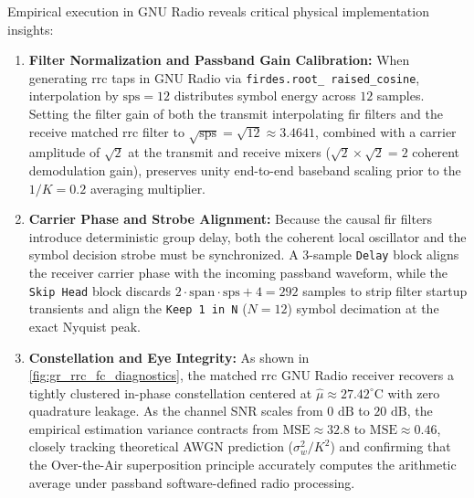 \documentclass[Markos_Delaportas_1316.tex]{subfiles}
\begin{document}
Empirical execution in GNU Radio reveals critical physical
implementation insights:
\begin{enumerate}
    \item \textbf{Filter Normalization and Passband Gain Calibration:}
        When generating \gls{rrc} taps in GNU Radio via
        \texttt{firdes.\allowbreak root\_\allowbreak
        raised\_\allowbreak cosine}, interpolation by
        $\text{sps} = 12$ distributes symbol energy across $12$
        samples. Setting the filter gain of both the transmit
        interpolating \gls{fir} filters and the receive matched
        \gls{rrc} filter to $\sqrt{\text{sps}} = \sqrt{12} \approx
        3.4641$, combined with a carrier amplitude of $\sqrt{2}$ at the
        transmit and receive mixers ($\sqrt{2} \times \sqrt{2} = 2$ coherent
        demodulation gain), preserves unity end-to-end baseband scaling
        prior to the $1/K = 0.2$ averaging multiplier.
    \item \textbf{Carrier Phase and Strobe Alignment:} Because the
        causal \gls{fir} filters introduce deterministic group delay, both
        the coherent local oscillator and the symbol decision strobe must
        be synchronized. A $3$-sample \texttt{Delay} block aligns the
        receiver carrier phase with the incoming passband waveform, while
        the \texttt{Skip Head} block discards $2 \cdot \text{span} \cdot
        \text{sps} + 4 = 292$ samples to strip filter startup transients
        and align the \texttt{Keep 1 in N} ($N = 12$) symbol decimation
        at the exact Nyquist peak.
    \item \textbf{Constellation and Eye Integrity:} As shown in
        \cref{fig:gr_rrc_fc_diagnostics}, the
        matched \gls{rrc} GNU Radio receiver recovers a tightly
        clustered in-phase constellation centered at $\hat{\mu} \approx
        27.42^\circ\text{C}$ with zero quadrature leakage. As the channel
        SNR scales from $0\text{ dB}$ to $20\text{ dB}$, the empirical
        estimation variance contracts from $\text{MSE} \approx 32.8$ to
        $\text{MSE} \approx 0.46$, closely tracking theoretical
        AWGN prediction ($\sigma_w^2 / K^2$) and confirming that the
        Over-the-Air superposition principle accurately computes the
        arithmetic average under passband software-defined radio processing.
\end{enumerate}

\ifSubfilesClassLoaded{
    \clearpage
    \printbibliography
}{}
\end{document}
